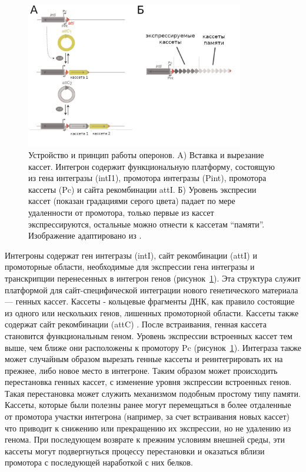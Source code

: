 \begin{figure}[!ht] 
  \center
  \includegraphics [width=0.85\textwidth] {Dissertation/images/lit/integron.jpg}
  \caption{Устройство и принцип работы оперонов. A) Вставка и вырезание кассет. Интегрон содержит функциональную платформу, состоящую из гена интегразы (intI1), промотора интегразы (Pint), промотора кассеты (Pc) и сайта рекомбинации attI. Б) Уровень экспресии кассет (показан градациями серого цвета) падает по мере удаленности от промотора, только первые из кассет экспрессируются, остальные можно отнести к кассетам ``памяти''. Изображение адаптировано из \cite{boyd2009genomic}.} 
  \label{img:integron}  
\end{figure}

Интегроны содержат ген интегразы (intI), сайт рекомбинации (attI) и промоторные области, необходимые для экспрессии гена интегразы и транскрипции перенесенных в интегрон генов (рисунок~\ref{img:integron}). Эта структура служит платформой для сайт-специфической интеграции нового генетического материала --- генных кассет. Кассеты - кольцевые фрагменты ДНК, как правило состоящие из одного или нескольких генов, лишенных промоторной области. Кассеты также содержат сайт рекомбинации (attC) \cite{gillings2014integrons}. После встраивания, генная кассета становится функциональным геном. Уровень экспрессии встроенных кассет тем выше, чем ближе они расположены к промотору Pc (рисунок~\ref{img:integron}). Интеграза также может случайным образом вырезать генные кассеты и реинтегрировать их на прежнее, либо новое место в интегроне. Таким образом может происходить перестановка генных кассет, с изменение уровня экспрессии встроенных генов. Такая перестановка может служить механизмом подобным простому типу памяти. Кассеты, которые были полезны ранее могут перемещаться в более отдаленные от промотора участки интегрона (например, за счет встраивания новых кассет) что приводит к снижению или прекращению их экспрессии, но не удалению из генома. При последующем возврате к прежним условиям внешней среды, эти кассеты могут подвергнуться процессу перестановки и оказаться вблизи промотора с последующей наработкой с них белков.   


